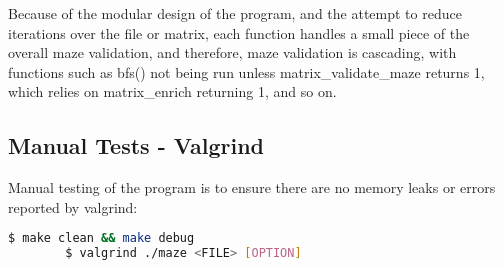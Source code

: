 \documentclass{article}
\begin{document}
    Because of the modular design of the program, and the attempt to reduce iterations over the file or matrix, each function handles a small piece of the overall maze validation, and therefore, maze validation is cascading, with functions such as bfs() not being run unless matrix\_validate\_maze returns 1, which relies on matrix\_enrich returning 1, and so on.

    \subsection{Manual Tests - Valgrind}
    Manual testing of the program is to ensure there are no memory leaks or errors reported by valgrind:
        \begin{lstlisting}[language=bash]
        $ make clean && make debug
        $ valgrind ./maze <FILE> [OPTION]
        \end{lstlisting}
\end{document}
